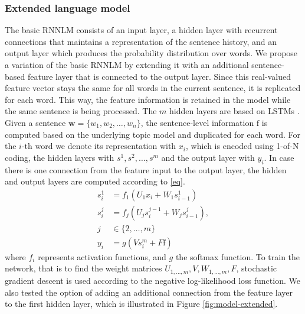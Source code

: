 \documentclass[a4paper]{article}
\begin{document}
\subsubsection{Extended language model}
The basic RNNLM consists of an input layer, a hidden layer with recurrent connections that maintains a representation of the sentence history, and an output layer which produces the probability distribution over words.
We propose a variation of the basic RNNLM by extending it with an additional sentence-based feature layer that is connected to the output layer. Since this real-valued feature vector stays the same for all words in the current sentence, it is replicated for each word. This way, the feature information is retained in the model while the same sentence is being processed.
The $m$ hidden layers are based on LSTMs \cite{hochreiter1997long}.
Given a sentence $\textbf{w} = \{w_1, w_2, \ldots, w_n\}$, the sentence-level information $\text{f}$ is computed based on the underlying topic model and duplicated for each word. For the $i$-th word we denote its representation with $x_i$, which is encoded using 1-of-N coding, the hidden layers with $s^1, s^2, \dots, s^m$ and the output layer with $y_i$. In case there is one connection from the feature input to the output layer, the hidden and output layers are computed according to \eqref{eq}.
\begin{equation}
\label{eq}
\begin{aligned}
s^1_i &= f_1(U_1x_i + W_1s^1_{i-1}) \\
s^j_i &= f_j(U_js^{j-1}_i + W_js^j_{i-1}), \\j &\in \{2,\ldots,m\} \\
y_i &= g(Vs^m_i + F\text{f})
\end{aligned}
\end{equation}
where $f_i$ represents activation functions, and $g$ the softmax function.
To train the network, that is to find the weight matrices $U_{1,\dots,m}, V, W_{1,\dots,m}, F$, stochastic gradient descent is used according to the negative log-likelihood loss function. We also tested the option of adding an additional connection from the feature layer to the first hidden layer, which is illustrated in Figure \ref{fig:model-extended}.
\end{document}
